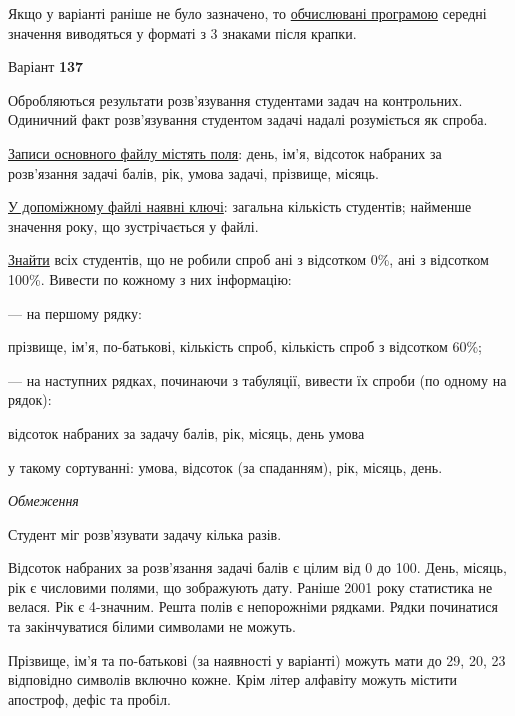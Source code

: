 \documentclass[11pt, ukrainian]{article}
\begin{document}
Якщо у варіанті раніше не було зазначено, то \underline{обчислювані програмою} середні значення виводяться у форматі з 3 знаками після крапки.




\par
\newpage

{\center Варіант  \No \textbf { 137 }\par}
\bigskip
Обробляються результати розв’язування студентами задач на контрольних.
Одиничний факт роз\-в’я\-зу\-вання студентом задачі надалі розуміється як спроба.

\underline{Записи основного файлу містять поля}: день, ім’я, відсоток набраних за розв’язання задачі балів, рік, умова задачі, прізвище, місяць.

\underline{У допоміжному файлі наявні ключі}: загальна кількість студентів; найменше значення року, що зустрічається у файлі.

\underline{Знайти} всіх студентів, що не робили спроб ані з відсотком 0\%, ані з відсотком 100\%. Вивести по кожному з них інформацію:\par
{\noindent}--- на першому рядку:\par
прізвище, ім’я, по-батькові, кількість спроб, кількість спроб з відсотком 60\%;

{\noindent}--- на наступних рядках, починаючи з табуляції, вивести їх спроби (по одному на рядок):\par
відсоток набраних за задачу балів, рік, місяць, день умова

{\noindent}у такому сортуванні: умова, відсоток (за спаданням), рік, місяць, день.


\bigskip\textit{Обмеження}

Студент міг розв’язувати задачу кілька разів.

Відсоток набраних за розв’язання задачі балів є цілим від 0 до 100.
День, місяць, рік є числовими полями, що зображують дату.
Раніше 2001 року статистика не велася. Рік є 4-значним.
Решта полів є непорожніми рядками.
Рядки починатися та закінчуватися білими символами не можуть.

Прізвище, ім’я та по-батькові (за наявності у варіанті) можуть мати до 29, 20, 23 відповідно символів включно кожне. 
Крім літер алфавіту можуть містити апостроф, дефіс та пробіл.
\end{document}
